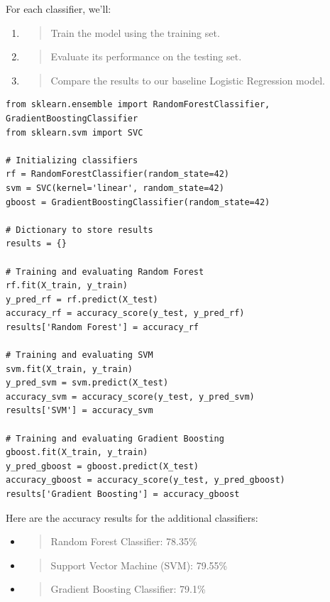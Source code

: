\documentclass[]{article}
\begin{document}
For each classifier, we'll:

\begin{enumerate}
\def\labelenumi{\arabic{enumi}.}
\item
  \begin{quote}
  Train the model using the training set.
  \end{quote}
\item
  \begin{quote}
  Evaluate its performance on the testing set.
  \end{quote}
\item
  \begin{quote}
  Compare the results to our baseline Logistic Regression model.
  \end{quote}
\end{enumerate}
\begin{verbatim}
from sklearn.ensemble import RandomForestClassifier, GradientBoostingClassifier
from sklearn.svm import SVC

# Initializing classifiers
rf = RandomForestClassifier(random_state=42)
svm = SVC(kernel='linear', random_state=42)
gboost = GradientBoostingClassifier(random_state=42)

# Dictionary to store results
results = {}

# Training and evaluating Random Forest
rf.fit(X_train, y_train)
y_pred_rf = rf.predict(X_test)
accuracy_rf = accuracy_score(y_test, y_pred_rf)
results['Random Forest'] = accuracy_rf

# Training and evaluating SVM
svm.fit(X_train, y_train)
y_pred_svm = svm.predict(X_test)
accuracy_svm = accuracy_score(y_test, y_pred_svm)
results['SVM'] = accuracy_svm

# Training and evaluating Gradient Boosting
gboost.fit(X_train, y_train)
y_pred_gboost = gboost.predict(X_test)
accuracy_gboost = accuracy_score(y_test, y_pred_gboost)
results['Gradient Boosting'] = accuracy_gboost
\end{verbatim}

Here are the accuracy results for the additional classifiers:

\begin{itemize}
\item
  \begin{quote}
  Random Forest Classifier: 78.35\%
  \end{quote}
\item
  \begin{quote}
  Support Vector Machine (SVM): 79.55\%
  \end{quote}
\item
  \begin{quote}
  Gradient Boosting Classifier: 79.1\%
  \end{quote}
\end{itemize}
\end{document}
